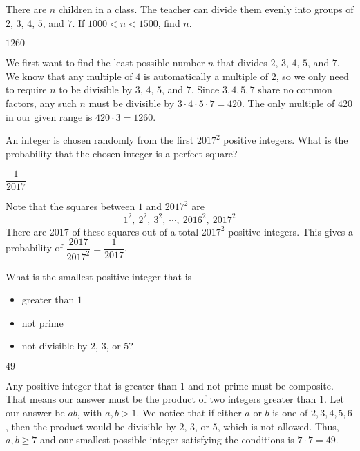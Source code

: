 \documentclass{article}
\begin{document}
\begin{problem}
There are $n$ children in a class. The teacher can divide them evenly into groups of $2$, $3$, $4$, $5$, and $7$. If $1000 < n < 1500$, find $n$.
\end{problem}
\begin{answer}
$1260$
\end{answer}
\begin{solution}
We first want to find the least possible number $n$ that divides $2$, $3$, $4$, $5$, and $7$. We know that any multiple of $4$ is automatically a multiple of $2$, so we only need to require $n$ to be divisible by $3$, $4$, $5$, and $7$. Since $3,4,5,7$ share no common factors, any such $n$ must be divisible by $3 \cdot 4 \cdot 5 \cdot 7 = 420$. The only multiple of $420$ in our given range is $420 \cdot 3 = \boxed{1260}$.
\end{solution}

\begin{problem}
An integer is chosen randomly from the first $2017^2$ positive integers. What is the probability that the chosen integer is a perfect square?
\end{problem}
\begin{answer}
$\dfrac{1}{2017}$
\end{answer}
\begin{solution}
Note that the squares between $1$ and $2017^2$ are \[1^2,\ 2^2,\ 3^2,\ \cdots,\ 2016^2,\ 2017^2\]There are $2017$ of these squares out of a total $2017^2$ positive integers. This gives a probability of $\dfrac{2017}{2017^2} = \boxed{\dfrac{1}{2017}}$.
\end{solution}

\begin{problem}
What is the smallest positive integer that is 
\begin{itemize}
    \item greater than $1$
    \item not prime
    \item not divisible by $2$, $3$, or $5$?
\end{itemize}
\end{problem}
\begin{answer}
$49$
\end{answer}
\begin{solution}
Any positive integer that is greater than $1$ and not prime must be composite. That means our answer must be the product of two integers greater than $1$. Let our answer be $ab$, with $a,b > 1$. We notice that if either $a$ or $b$ is one of $2, 3, 4, 5, 6$, then the product would be divisible by $2$, $3$, or $5$, which is not allowed. Thus, $a, b \ge 7$ and our smallest possible integer satisfying the conditions is $7 \cdot 7 = \boxed{49}$.
\end{solution}
\end{document}
